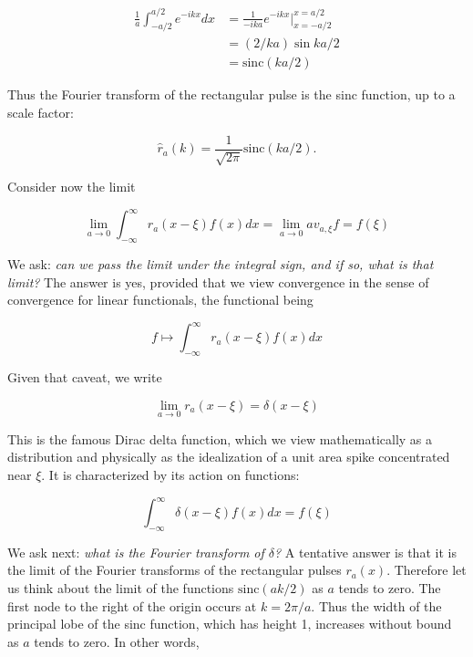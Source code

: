 \begin{align}
\frac{1}{a}\int_{-a/2}^{a/2} e^{-ikx} dx
  &= \frac{1}{-ika} e^{-ikx} \Big\vert_{x=-a/2}^{x=a/2} \\
  &= (2/ka)\sin ka/2 \\
  &= \text{sinc}(ka/2)
\end{align}

Thus the Fourier transform of the rectangular pulse is the sinc function, up to a scale factor:

\begin{equation}
\hat r_a(k) = \frac{1}{\sqrt{2\pi}}\text{sinc}(ka/2).
\end{equation}

Consider now the limit

\begin{equation}
\lim_{a \to 0}\int_{-\infty}^\infty r_a(x-\xi) f(x) dx = \lim_{a\to 0} av_{a,\xi} f = f(\xi)
\end{equation}

We ask: \emph{can we pass the limit under the integral sign, and if so, what is that limit?} The answer is yes, provided that we view convergence in the sense of convergence for linear functionals, the functional being

\begin{equation}
f \mapsto \int_{-\infty}^\infty r_a(x-\xi) f(x) dx 
\end{equation}

Given that caveat, we write

\begin{equation}
\lim_{a \to 0} r_a(x-\xi)  = \delta(x - \xi)
\end{equation}

This is the famous Dirac delta function, which we view mathematically as a distribution and physically as the idealization of a unit area spike concentrated near $\xi$.
It is characterized by its action on functions:

\begin{equation}
\label{diracdelta1}
 \int_{-\infty}^\infty \delta(x-\xi)f(x)dx = f(\xi)
\end{equation}



We ask next: \emph{what is the Fourier transform of $\delta$?}
A tentative answer is that it is the limit of the Fourier transforms of the rectangular pulses $r_a(x)$.  Therefore let us think about the limit of the functions $\text{sinc}(ak/2)$ as $a$ tends to zero.  The first node to the right of the origin occurs at $k = 2\pi/a$.  Thus the width of the principal lobe of the sinc function, which has height 1, increases without bound as $a$ tends to zero.  In other words, 

